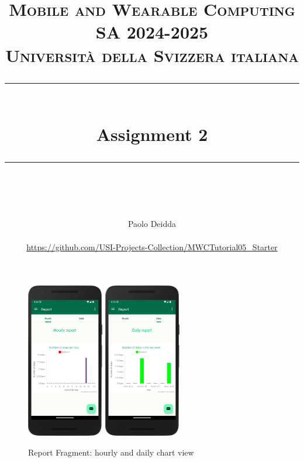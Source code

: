 \documentclass{article}
\title{
	\normalfont\normalsize
	\textsc{Mobile and Wearable Computing SA 2024-2025\\%
	Universit\`a della Svizzera italiana}\\
	\vspace{25pt}
	\rule{\linewidth}{0.5pt}\\
	\vspace{20pt}
	{\huge Assignment 2}\\
	\vspace{12pt}
	\rule{\linewidth}{1pt}\\
	\vspace{12pt}
}
\author{
  Paolo Deidda \\
  \text{paolo.deidda@usi.ch} \\ 
  \url{https://github.com/USI-Projects-Collection/MWCTutorial05_Starter}
}
\newcommand{\codepath}{../app/src/main}
\begin{document}
\maketitle

\tableofcontents

%
%
%
%

\vspace{1cm}

\begin{figure}[H]
    \centering
    \includegraphics[width=0.30\textwidth]{res/img/ops}
    \hspace{1cm}
    \includegraphics[width=0.30\textwidth]{res/img/oneAndOnlyPicture}
    \caption{Report Fragment: hourly and daily chart view}
    \label{fig:thePicture}
\end{figure}

\newpage


%
%
%
\end{document}
